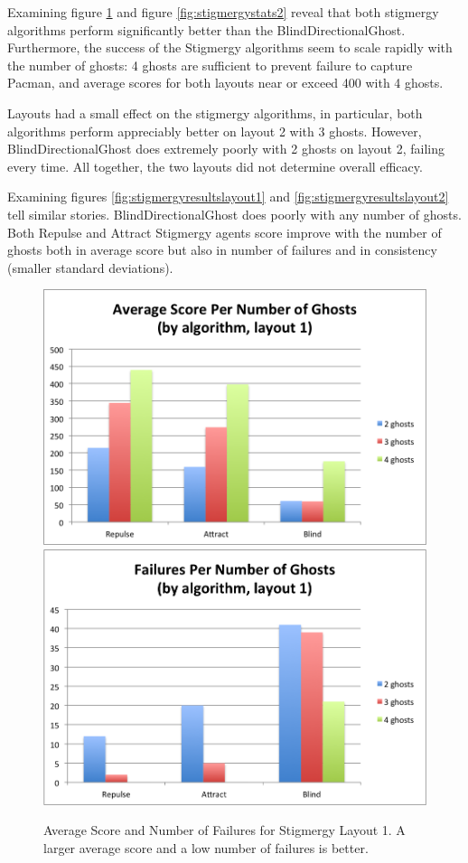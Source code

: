 \documentclass[11pt]{article}
\begin{document}
Examining figure \ref{fig:stigmergystats1} and figure \ref{fig:stigmergystats2} reveal that both stigmergy algorithms perform significantly better than the BlindDirectionalGhost.  Furthermore, the success of the Stigmergy algorithms seem to scale rapidly with the number of ghosts: 4 ghosts are sufficient to prevent failure to capture Pacman, and average scores for both layouts near or exceed 400 with 4 ghosts. 

Layouts had a small effect on the stigmergy algorithms, in particular, both algorithms perform appreciably better on layout 2 with 3 ghosts.  However, BlindDirectionalGhost does extremely poorly with 2 ghosts on layout 2, failing every time.  All together, the two layouts did not determine overall efficacy.

Examining figures \ref{fig:stigmergyresultslayout1} and \ref{fig:stigmergyresultslayout2} tell similar stories.  BlindDirectionalGhost does poorly with any number of ghosts.  Both Repulse and Attract Stigmergy agents score improve with the number of ghosts both in average score but also in number of failures and in consistency (smaller standard deviations).

\begin{figure}[H]
	\includegraphics[width=0.5 \columnwidth]{stigmergytrendclassicscore.png}
	\includegraphics[width= 0.5 \columnwidth]{stigmergytrendclassicfail.png}
	\caption{Average Score and Number of Failures for Stigmergy Layout 1.  A larger average score and a low number of failures is better.}
	\label{fig:stigmergystats1}
\end{figure}
\end{document}
